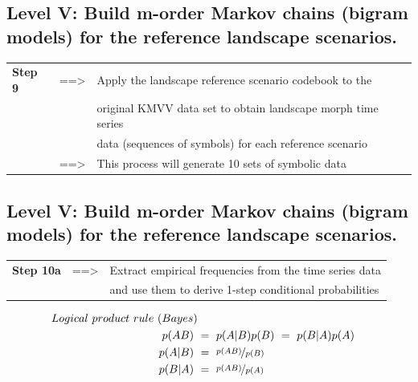 \documentclass[
paper=128mm:96mm, %
fontsize=11pt, %
pagesize, %
parskip=half-, %
]{scrartcl} %
\theoremstyle{mythmstyle} %
\begin{document}
\subsection{Level V: Build m-order Markov chains (bigram models) for the reference landscape scenarios.}
\footnotesize 
\begin{tabular}{lll}
	\textbf{Step 9} & ==> & Apply the landscape reference scenario codebook to the \\
	& & original KMVV data set to obtain landscape morph time series \\
	& &  data (sequences of symbols) for each reference scenario\\
	& ==> & This process will generate 10 sets of symbolic data
	
\end{tabular}

\clearpage
\subsection{Level V: Build m-order Markov chains (bigram models) for the reference landscape scenarios.}
\footnotesize 
\begin{tabular}{lll}
	\textbf{Step 10a} & ==> & Extract empirical frequencies from the time series data \\
	& & and use them to derive 1-step conditional probabilities 	
\end{tabular}
\begin{align*}
Logical \ product \ rule \ (Bayes)\\
p(AB) \ &= \ p(A|B)p(B) \ = \ p(B|A)p(A)\\
p(A|B) \ &= \ \nicefrac{p(AB)}{p(B)}\\
p(B|A) \ &= \ \nicefrac{p(AB)}{p(A)}
\end{align*}


\clearpage
\end{document}
